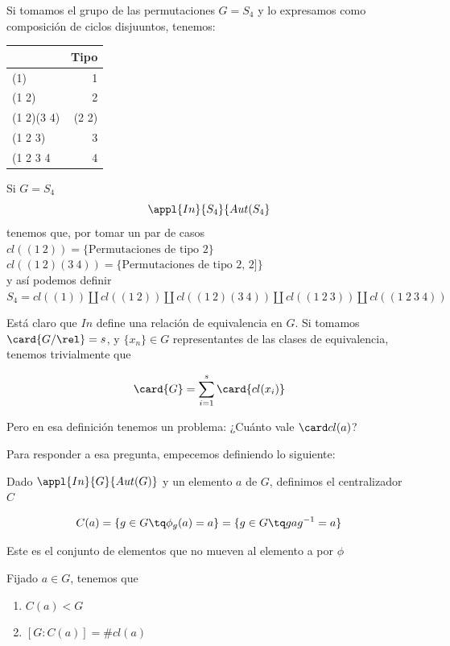 \documentclass[nochap]{apuntes}
\begin{document}
\begin{example}
Si tomamos el grupo de las permutaciones $G=S_4$ y lo expresamos como composición de ciclos disjuuntos, tenemos:\\
\begin{center}
\begin{tabular}{|l|r|}
\hline
& Tipo\\ 
\hline
(1) & 1\\
(1 2) & 2\\
(1 2)(3 4) & (2 2)\\
(1 2 3) & 3\\
(1 2 3 4 & 4\\
\hline
\end{tabular}
\end{center}
Si $G=S_4$\\
$$\appl{In}{S_4}{Aut(S_4}$$
tenemos que, por tomar un par de casos
$cl((1\ 2)) = \{ \text{Permutaciones de tipo 2} \}$\\
$cl((1\ 2)(3\ 4)) = \{ \text{Permutaciones de tipo 2, 2]} \}$\\
y así podemos definir\\
$S_4 = cl((1)) \coprod cl((1\ 2)) \coprod cl((1\ 2)(3\ 4)) \coprod cl((1\ 2\ 3)) \coprod cl((1\ 2\ 3\ 4))$
\end{example}

Está claro que $In$ define una relación de equivalencia en $G$. Si tomamos $\card{G/\rel} = s$, y $\{x_n\}∈G$ representantes de las clases de equivalencia, tenemos trivialmente que 

\[ \card{G} = \sum_{i=1}^{s} \card{cl(x_i)} \]

Pero en esa definición tenemos un problema: ¿Cuánto vale $\card cl(a)$?

Para responder a esa pregunta, empecemos definiendo lo siguiente:

\begin{defn}[Centralizador] Dado $\appl{In}{G}{Aut(G)}$ y un elemento $a$ de $G$, definimos el centralizador $C$

\[ C(a) = \{ g\in G \tq \phi _g(a) = a\} = \{ g\in G \tq gag^{-1} = a\} \]

Este es el conjunto de elementos que no mueven al elemento a por $\phi$
\end{defn}

\begin{theorem}\label{thmConj1}
Fijado $a\in G$, tenemos que
\begin{enumerate}
\item $C(a) < G$
\item $[ G:C(a) ] = \# cl(a) $ 
\end{enumerate}
\end{theorem}
\end{document}
